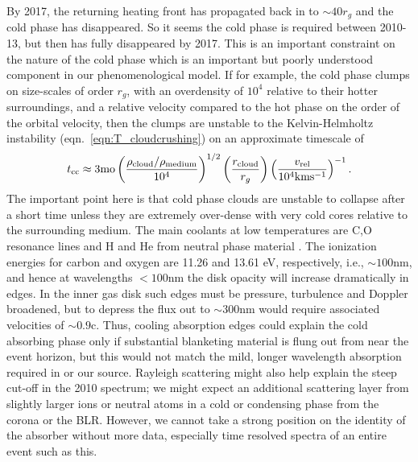\documentclass[a4paper,fleqn,usenatbib]{mnras}
\begin{document}
By 2017, the returning heating front has propagated back in to $\sim 40r_{g}$ and the cold phase has disappeared. So it seems the cold phase is required between 2010-13, but then has fully disappeared by 2017. This is an important constraint on the nature of the cold phase which is an important but poorly understood component in our phenomenological model. If for example, the cold phase clumps on size-scales of order $r_g$, with an overdensity of $10^{4}$ relative to their hotter surroundings,
and a relative velocity compared to the hot phase on the order of the orbital velocity, then the clumps are
unstable to the Kelvin-Helmholtz instability
(eqn.~\ref{eqn:T_cloudcrushing}) on an
approximate timescale of
\begin{equation}
t_{{\rm cc}} \approx 3{\rm mo} 
               \left( \frac{\rho_{\rm{cloud}}/\rho_{\rm{medium}}}{10^{4}}   \right)^{1/2}
               \left( \frac{r_{\rm cloud}}{r_{g}}\right) 
              \left( \frac{v_{\rm rel}}{10^{4}\rm{km s^{-1}}} \right)^{-1}.
\end{equation}
The important point here is that cold phase clouds
are unstable to collapse after a short time unless they are extremely
over-dense with very cold cores relative to the surrounding
medium. The main coolants at low temperatures are C,O resonance lines 
and H and He from neutral phase material \citep[see e.g., Fig. 18 in
][]{Sutherland_Dopita1993}. The ionization energies for carbon and
oxygen are 11.26 and 13.61 eV, respectively, i.e., $\sim 100$nm, and
hence at wavelengths $<100$nm the disk opacity will increase
dramatically in edges. In the inner gas disk such edges must be pressure,
turbulence and Doppler broadened, but to depress the flux out to $\sim 300$nm would require associated velocities of $\sim 0.9$c. Thus, cooling absorption edges could explain the cold absorbing phase only if substantial blanketing material is flung out from near the event horizon, but this would not match the mild, longer wavelength absorption required in \citep{Guo_2016} or our source. Rayleigh scattering might also help explain the steep cut-off in the 2010 spectrum; we might expect an additional scattering layer from slightly larger ions or neutral atoms in a cold or condensing phase from the corona or the BLR. However, we cannot take a strong position on the identity of the absorber without more data, especially time resolved spectra of an entire event such as this.
\end{document}
